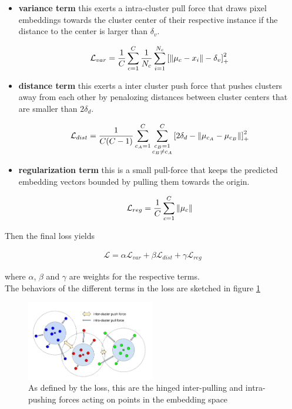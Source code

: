 \begin{itemize}
	\item \textbf{variance term} this exerts a intra-cluster pull force that draws pixel embeddings towards the cluster center of their respective instance if the distance to the center is larger than $\delta_v$.
	
	\begin{align}
		\mathcal{L}_{var} = \frac{1}{C} \sum_{c=1}^C \frac{1}{N_c} \sum_{i=1}^{N_c} \left[ \left\lVert\mu_c - x_i\right\rVert - \delta_v \right]_+^2
	\end{align}
	
	\item \textbf{distance term} this exerts a inter cluster push force that pushes clusters away from each other by penalozing distances between cluster centers that are smaller than $2\delta_d$.
	
	\begin{align}
		\mathcal{L}_{dist} = \frac{1}{C(C-1)} \sum_{c_A=1}^C \sum_{\substack{c_B=1 \\ c_B \neq c_A}}^C \left[ 2\delta_d - \left\lVert\mu_{c_A} - \mu_{c_B}\right\rVert \right]_+^2
	\end{align}
	
	\item \textbf{regularization term} this is a small pull-force that keeps the predicted embedding vectors bounded by pulling them towards the origin.
	
	\begin{align}
		\mathcal{L}_{reg} = \frac{1}{C} \sum_{c=1}^C \left\lVert\mu_c\right\rVert
 	\end{align}
\end{itemize}

Then the final loss yields

\begin{align}
	\mathcal{L} = \alpha \mathcal{L}_{var} + \beta \mathcal{L}_{dist} + \gamma \mathcal{L}_{reg}
\end{align}

where $\alpha$, $\beta$ and $\gamma$ are weights for the respective terms.\\

The behaviors of the different terms in the loss are sketched in figure \ref{fig_contrastive}

\begin{figure}[ht]
	\centering
	\includegraphics[width=0.5\textwidth]{figures/contrastive_loss.png}
	\caption{As defined by the loss, this are the hinged inter-pulling and intra-pushing forces acting on points in the embedding space \cite{brab2017semantic}}
	\label{fig_contrastive}
\end{figure}

